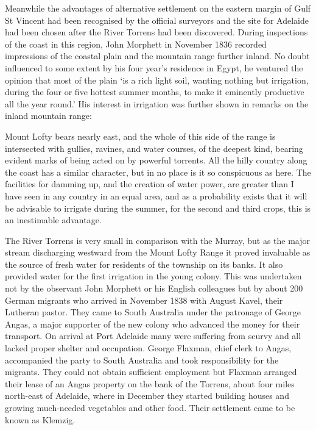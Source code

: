 Meanwhile the advantages of alternative settlement on the eastern
margin of Gulf St Vincent  had been recognised
by the official surveyors and the site for Adelaide
 had
been chosen after the River Torrens  had been
discovered.  During inspections of the coast in this region, John
Morphett  in November 1836 recorded impressions of
the coastal plain and the mountain range further inland.  No doubt
influenced to some extent by his four year's residence in Egypt, he
ventured the opinion that most of the plain `is a rich light soil,
wanting nothing but irrigation, during the four or five hottest summer
months, to make it eminently productive all the year round.'  His
interest in irrigation was further shown in remarks on the inland
mountain range:
\begin{Quote}
	Mount Lofty bears nearly east, and the whole of this side of
	the range is intersected with gullies, ravines, and water
	courses, of the deepest kind, bearing evident marks of being
	acted on by powerful torrents.  All the hilly country along
	the coast has a similar character, but in no place is it so
	conspicuous as here.  The facilities for damming up, and the
	creation of water power, are greater than I have seen in any
	country in an equal area, and as a probability exists that it
	will be advisable to irrigate during the summer, for the
	second and third crops, this is an inestimable
	advantage.
\end{Quote}

The River Torrens is very small in comparison with the Murray, but as
the major stream discharging westward from the Mount Lofty
 Range it
proved invaluable as the source of fresh water for residents of the
township on its banks.  It also provided water for the first
irrigation in the young colony.  This was undertaken not by the
observant John Morphett or his English colleagues but by about 200
German migrants who arrived in November 1838 with August Kavel,
 their
Lutheran pastor.  They came to South Australia under the patronage of
George Angas,  a major supporter of the new colony
who advanced the money for their transport. On arrival at Port
Adelaide many were suffering from scurvy and all lacked proper shelter
and occupation. George Flaxman,  chief clerk to
Angas, accompanied the party to South Australia and took
responsibility for the migrants.  They could not obtain sufficient
employment but Flaxman arranged their lease of an Angas property on
the bank of the Torrens, about four miles north-east of Adelaide,
where in December they started building houses and growing much-needed
vegetables and other food.  Their settlement came to be known as
Klemzig. 

